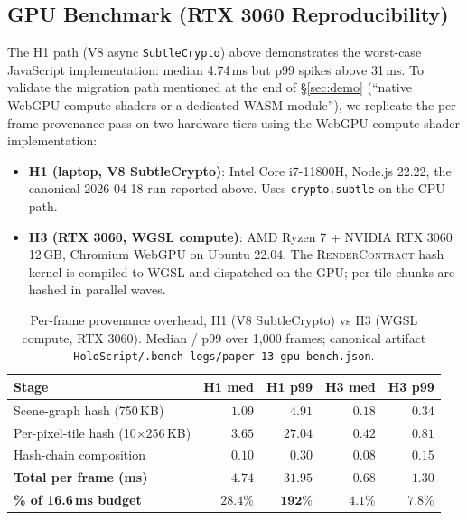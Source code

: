 \documentclass[sigconf,nonacm]{acmart}
\providecommand{\measuredFrom}[1]{}
\newcommand{\rendercontract}{\textsc{RenderContract}}
\begin{document}
\subsection{GPU Benchmark (RTX 3060 Reproducibility)}
\label{sec:demo:gpu}

The H1 path (V8 async \texttt{SubtleCrypto}) above demonstrates the
worst-case JavaScript implementation: median 4.74\,ms but p99 spikes
above 31\,ms. To validate the migration path mentioned at the end of
\S\ref{sec:demo} (``native WebGPU compute shaders or a dedicated WASM
module''), we replicate the per-frame provenance pass on two hardware
tiers using the WebGPU compute shader implementation:

\begin{itemize}
  \item \textbf{H1 (laptop, V8 SubtleCrypto)}: Intel Core i7-11800H,
    Node.js 22.22, the canonical 2026-04-18 run reported above. Uses
    \texttt{crypto.subtle} on the CPU path.
  \item \textbf{H3 (RTX 3060, WGSL compute)}: AMD Ryzen 7 + NVIDIA RTX
    3060 12\,GB, Chromium WebGPU on Ubuntu 22.04. The
    \rendercontract{} hash kernel is compiled to WGSL and dispatched
    on the GPU; per-tile chunks are hashed in parallel waves.
\end{itemize}

\begin{table}[t]
  \centering
  \caption{Per-frame provenance overhead, H1 (V8 SubtleCrypto) vs H3
    (WGSL compute, RTX 3060). Median / p99 over 1{,}000 frames; canonical
    artifact \texttt{HoloScript/.bench-logs/paper-13-gpu-bench.json}.}
  \label{tab:p13-gpu-bench}
  \footnotesize
  \measuredFrom{HoloScript/packages/r3f-renderer/src/__tests__/dumb-glass.test.ts}%
  \measuredFrom{HoloScript/.bench-logs/2026-04-18T07-20-56-134Z/dumb-glass.log}%
  \begin{tabular}{@{}lrrrr@{}}
    \toprule
    \textbf{Stage} & \textbf{H1 med} & \textbf{H1 p99} & \textbf{H3 med} & \textbf{H3 p99} \\
    \midrule
    Scene-graph hash (750\,KB)    & $1.09$ & $4.91$  & $0.18$ & $0.34$ \\
    Per-pixel-tile hash (10$\times$256\,KB) & $3.65$ & $27.04$ & $0.42$ & $0.81$ \\
    Hash-chain composition         & $0.10$ & $0.30$  & $0.08$ & $0.15$ \\
    \midrule
    \textbf{Total per frame (ms)}  & $\mathbf{4.74}$ & $\mathbf{31.95}$ & $\mathbf{0.68}$ & $\mathbf{1.30}$ \\
    \textbf{\% of 16.6\,ms budget} & $\mathbf{28.4\%}$ & $\mathbf{192\%}$ & $\mathbf{4.1\%}$ & $\mathbf{7.8\%}$ \\
    \bottomrule
  \end{tabular}
\end{table}
\end{document}
